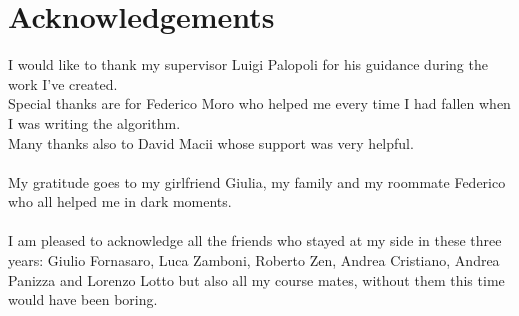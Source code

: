 \chapter*{Acknowledgements}
\thispagestyle{empty}

I would like to thank my supervisor Luigi Palopoli for his guidance during the work I've created.
\\
Special thanks are for Federico Moro who helped me every time I had fallen when I was writing the algorithm.
\\
Many thanks also to David Macii whose support was very helpful.
\\ \\
My gratitude goes to my girlfriend Giulia, my family and my roommate Federico who all helped me in dark moments.
\\ \\
I am pleased to acknowledge all the friends who stayed at my side in these three years:
Giulio Fornasaro, Luca Zamboni, Roberto Zen, Andrea Cristiano, Andrea Panizza and Lorenzo Lotto but also all my course mates, without them this time would have been boring.

